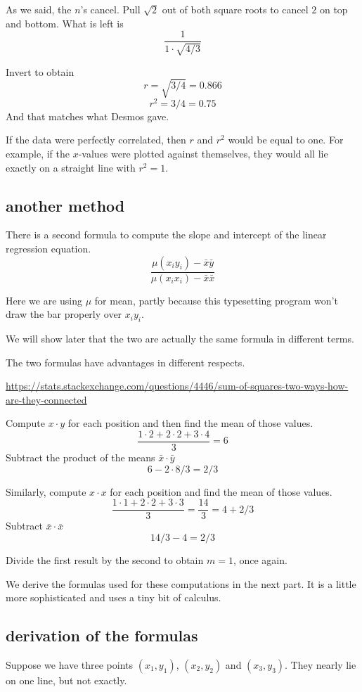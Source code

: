 \documentclass[11pt, oneside]{article}
\begin{document}
As we said, the $n$'s cancel.  Pull $\sqrt{2}$ out of both square roots to cancel $2$ on top and bottom.  What is left is
\[ \frac{1}{1 \cdot \sqrt{4/3}} \]

Invert to obtain 
\[ r = \sqrt{3/4} = 0.866 \]
\[ r^2 = 3/4 = 0.75 \]
And that matches what Desmos gave.

If the data were perfectly correlated, then $r$ and $r^2$ would be equal to one.  For example, if the $x$-values were plotted against themselves, they would all lie exactly on a straight line with $r^2 = 1$.

\subsection*{another method}
There is a second formula to compute the slope and intercept of the linear regression equation.  
\[ \frac{\mu (x_i y_i) - \bar{x} \bar{y}}{\mu (x_i x_i) - \bar{x} \bar{x}} \]

Here we are using $\mu$ for mean, partly because this typesetting program won't draw the bar properly over $x_i y_i$.

We will show later that the two are actually the same formula in different terms.

The two formulas have advantages in different respects.

\url{https://stats.stackexchange.com/questions/4446/sum-of-squares-two-ways-how-are-they-connected}

Compute $x \cdot y$ for each position and then find the mean of those values.
\[ \frac{1 \cdot 2 + 2 \cdot 2 + 3 \cdot 4}{3} = 6 \]
Subtract the product of the means $\bar{x} \cdot \bar{y}$ 
\[ 6 - 2 \cdot 8/3 = 2/3 \]

Similarly, compute $x \cdot x$ for each position and find the mean of those values.
\[ \frac{1 \cdot 1 + 2 \cdot 2 + 3 \cdot 3}{3} = \frac{14}{3} = 4 + 2/3 \]
Subtract $\bar{x} \cdot \bar{x}$
\[ 14/3 - 4 = 2/3 \]

Divide the first result by the second to obtain $m = 1$, once again.

We derive the formulas used for these computations in the next part.  It is a little more sophisticated and uses a tiny bit of calculus.

\subsection*{derivation of the formulas}
Suppose we have three points $(x_1,y_1)$, $(x_2,y_2)$ and $(x_3,y_3)$.  They nearly lie on one line, but not exactly.
\end{document}
